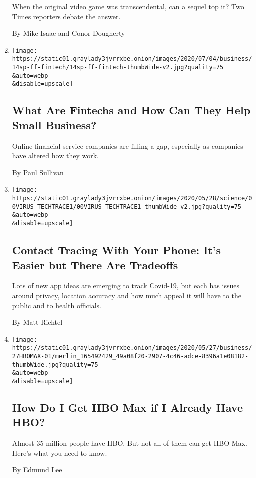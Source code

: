 \begin{enumerate}
  When the original video game was transcendental, can a sequel top it?
  Two Times reporters debate the answer.

  By Mike Isaac and Conor Dougherty
\item
  \href{/2020/06/10/business/economy/fintechs-loan-small-business.html}{}

  \texttt{[image: https://static01.graylady3jvrrxbe.onion/images/2020/07/04/business/14sp-ff-fintech/14sp-ff-fintech-thumbWide-v2.jpg?quality=75\\\&auto=webp\\\&disable=upscale]}

  \hypertarget{what-are-fintechs-and-how-can-they-help-small-business}{%
  \subsection{What Are Fintechs and How Can They Help Small
  Business?}\label{what-are-fintechs-and-how-can-they-help-small-business}}

  Online financial service companies are filling a gap, especially as
  companies have altered how they work.

  By Paul Sullivan
\item
  \href{/2020/06/03/health/coronavirus-contact-tracing-apps.html}{}

  \texttt{[image: https://static01.graylady3jvrrxbe.onion/images/2020/05/28/science/00VIRUS-TECHTRACE1/00VIRUS-TECHTRACE1-thumbWide-v2.jpg?quality=75\\\&auto=webp\\\&disable=upscale]}

  \hypertarget{contact-tracing-with-your-phone-its-easier-but-there-are-tradeoffs}{%
  \subsection{Contact Tracing With Your Phone: It's Easier but There Are
  Tradeoffs}\label{contact-tracing-with-your-phone-its-easier-but-there-are-tradeoffs}}

  Lots of new app ideas are emerging to track Covid-19, but each has
  issues around privacy, location accuracy and how much appeal it will
  have to the public and to health officials.

  By Matt Richtel
\item
  \href{/article/hbo-max-amazon-roku.html}{}

  \texttt{[image: https://static01.graylady3jvrrxbe.onion/images/2020/05/27/business/27HBOMAX-01/merlin\_165492429\_49a08f20-2907-4c46-adce-8396a1e08182-thumbWide.jpg?quality=75\\\&auto=webp\\\&disable=upscale]}

  \hypertarget{how-do-i-get-hbo-max-if-i-already-have-hbo}{%
  \subsection{How Do I Get HBO Max if I Already Have
  HBO?}\label{how-do-i-get-hbo-max-if-i-already-have-hbo}}

  Almost 35 million people have HBO. But not all of them can get HBO
  Max. Here's what you need to know.

  By Edmund Lee
\end{enumerate}

